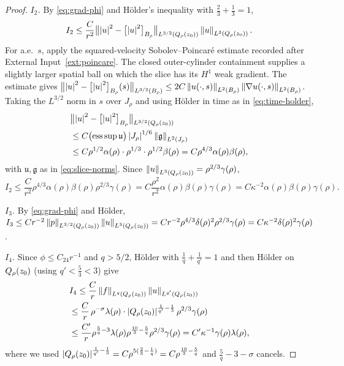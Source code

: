 \documentclass[11pt,reqno]{amsart}
\begin{document}
\begin{proof}
\emph{$I_{2}$.} By \eqref{eq:grad-phi} and H\"older's inequality with
$\tfrac23+\tfrac13=1$,
\[
  I_{2}\le\frac{C}{r^{2}}
    \bigl\|\left\lvert u \right\rvert^{2}-\bigl[\left\lvert u \right\rvert^{2}\bigr]_{B_{\rho}}\bigr\|_{L^{3/2}(Q_{\rho}(z_{0}))}
    \left\lVert u \right\rVert_{L^{3}(Q_{\rho}(z_{0}))} .
\]
For a.e.\ $s$, apply the squared-velocity Sobolev--Poincar\'e estimate
recorded after External Input~\ref{ext:poincare}. The closed outer-cylinder
containment supplies a slightly larger spatial ball on which the slice
has its $H^1$ weak gradient. The estimate gives
$\bigl\|\left\lvert u \right\rvert^{2}-\bigl[\left\lvert u \right\rvert^{2}\bigr]_{B_{\rho}}(s)\bigr\|_{L^{3/2}(B_{\rho})}
 \le2C\left\lVert u(\cdot,s) \right\rVert_{L^{2}(B_{\rho})}\left\lVert \nabla u(\cdot,s) \right\rVert_{L^{2}(B_{\rho})}$.
Taking the $L^{3/2}$ norm in $s$ over $J_{\rho}$ and using H\"older in time as
in \eqref{eq:time-holder},
\[\begin{aligned}
  &\bigl\|\left\lvert u \right\rvert^{2}-\bigl[\left\lvert u \right\rvert^{2}\bigr]_{B_{\rho}}\bigr\|_{L^{3/2}(Q_{\rho}(z_{0}))}
  \\ &\le C\bigl(\operatorname*{ess\,sup}\mathfrak{u}\bigr)
     \left\lvert J_{\rho} \right\rvert^{1/6}\left\lVert \mathfrak{g} \right\rVert_{L^{2}(J_{\rho})}
  \\ &\le C\rho^{1/2}\alpha(\rho)\cdot\rho^{1/3}\cdot\rho^{1/2}\beta(\rho)
  = C\rho^{4/3}\alpha(\rho)\beta(\rho),
\end{aligned}\]
with $\mathfrak{u},\mathfrak{g}$ as in \eqref{eq:slice-norms}. Since
$\left\lVert u \right\rVert_{L^{3}(Q_{\rho}(z_{0}))}=\rho^{2/3}\gamma(\rho)$,
\[
  I_{2}\le\frac{C}{r^{2}}\rho^{4/3}\alpha(\rho)\beta(\rho)\rho^{2/3}\gamma(\rho)
  =C\frac{\rho^{2}}{r^{2}}\alpha(\rho)\beta(\rho)\gamma(\rho)
  =C\kappa^{-2}\alpha(\rho)\beta(\rho)\gamma(\rho).
\]

\emph{$I_{3}$.} By \eqref{eq:grad-phi} and H\"older,
$I_{3}\le Cr^{-2}\left\lVert p \right\rVert_{L^{3/2}(Q_{\rho}(z_{0}))}\left\lVert u \right\rVert_{L^{3}(Q_{\rho}(z_{0}))}
 =Cr^{-2}\rho^{4/3}\delta(\rho)^{2}\rho^{2/3}\gamma(\rho)
 =C\kappa^{-2}\delta(\rho)^{2}\gamma(\rho)$.

\emph{$I_{4}$.} Since $\phi\le C_{24}r^{-1}$ and $q>5/2$, H\"older with
$\tfrac1q+\tfrac1{q'}=1$ and then H\"older on $Q_{\rho}(z_{0})$ (using
$q'<\tfrac53<3$) give
\[\begin{aligned}
  &I_{4}\le\frac{C}{r}\left\lVert f \right\rVert_{L^{q}(Q_{\rho}(z_{0}))}\left\lVert u \right\rVert_{L^{q'}(Q_{\rho}(z_{0}))}
  \\ &\le\frac{C}{r}\,\rho^{-\sigma}\lambda(\rho)\cdot
     \left\lvert Q_{\rho}(z_{0}) \right\rvert^{\frac1{q'}-\frac13}\rho^{2/3}\gamma(\rho)
  \\ &\le\frac{C'}{r}\rho^{\frac5q-3}\lambda(\rho)\rho^{\frac{10}{3}-\frac5q}\rho^{2/3}\gamma(\rho)
  =C'\kappa^{-1}\gamma(\rho)\lambda(\rho),
\end{aligned}\]
where we used $\left\lvert Q_{\rho}(z_{0}) \right\rvert^{\frac1{q'}-\frac13}
 =C\rho^{5(\frac23-\frac1q)}=C\rho^{\frac{10}3-\frac5q}$ and
$\tfrac5q-3-\sigma$ cancels.


\end{proof}
\end{document}
